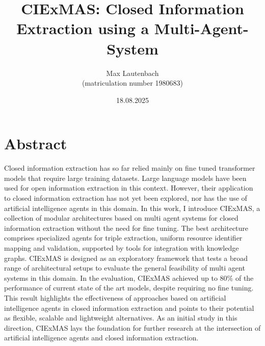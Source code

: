 \documentclass[a4paper,oneside,bibliography=totoc]{scrbook}
\begin{document}
\frontmatter
\subject{Master Thesis}
\title{CIExMAS: Closed Information Extraction using a Multi-Agent-System}
\author{Max Lautenbach\\
  (matriculation number 1980683)}
\date{18.08.2025}
\publishers{{\small Submitted to}\\
  Data and Web Science Group\\
  Dr.\ Sven Hertling\\
  University of Mannheim\\}
\maketitle

\chapter{Abstract}
Closed information extraction has so far relied mainly on fine tuned transformer models that require large training datasets. Large language models have been used for open information extraction in this context. However, their application to closed information extraction has not yet been explored, nor has the use of artificial intelligence agents in this domain. In this work, I introduce CIExMAS, a collection of modular architectures based on multi agent systems for closed information extraction without the need for fine tuning. The best architecture comprises specialized agents for triple extraction, uniform resource identifier mapping and validation, supported by tools for integration with knowledge graphs. CIExMAS is designed as an exploratory framework that tests a broad range of architectural setups to evaluate the general feasibility of multi agent systems in this domain. In the evaluation, CIExMAS achieved up to 80\% of the performance of current state of the art models, despite requiring no fine tuning. This result highlights the effectiveness of approaches based on artificial intelligence agents in closed information extraction and points to their potential as flexible, scalable and lightweight alternatives. As an initial study in this direction, CIExMAS lays the foundation for further research at the intersection of artificial intelligence agents and closed information extraction.

\begingroup%
\hypersetup{hidelinks}%
\tableofcontents%
\endgroup

\begingroup%
\hypersetup{hidelinks}%
\listoffigures%
\endgroup
\end{document}
